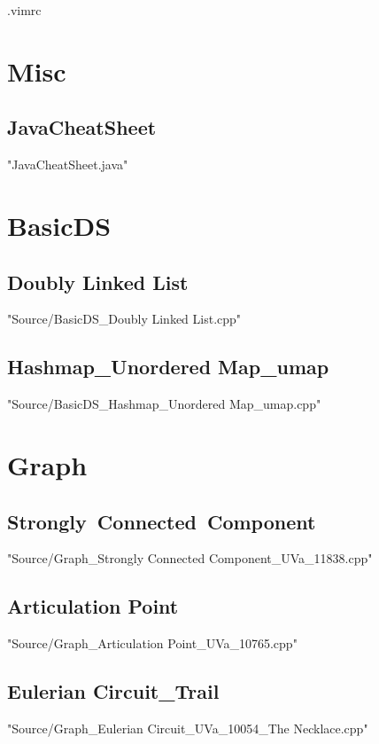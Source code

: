 \documentclass [12pt,twocolumn,oneside]{article}
\begin{document}
\pagestyle{fancy}
\fancyfoot{}
\fancyhead[R]{\thepage}
\renewcommand{\headrulewidth}{0.4pt}
\renewcommand{\contentsname}{Contents} 
\scriptsize
\tableofcontents

\bigskip
 {.vimrc}

\newpage
\section{Misc}
\subsection{JavaCheatSheet}
 {"JavaCheatSheet.java"}

\newpage
\section{BasicDS}
\subsection{Doubly Linked List}
 {"Source/BasicDS_Doubly Linked List.cpp"}
\subsection{Hashmap\_Unordered Map\_umap}
 {"Source/BasicDS_Hashmap_Unordered Map_umap.cpp"}

\newpage
\section{Graph}
\subsection{Strongly\ Connected\ Component}
 {"Source/Graph_Strongly Connected Component_UVa_11838.cpp"}
\subsection{Articulation Point}
 {"Source/Graph_Articulation Point_UVa_10765.cpp"}
\subsection{Eulerian Circuit\_Trail}
 {"Source/Graph_Eulerian Circuit_UVa_10054_The Necklace.cpp"}
\end{document}
